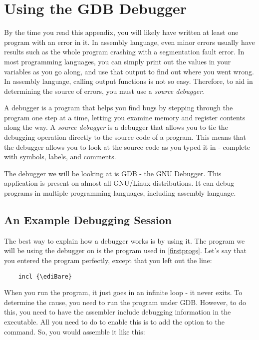 \chapter{Using the GDB Debugger}
\label{gdbappendix}

By the time you read this appendix, you will likely have written at least
one program with an error in it.  In assembly language, even minor errors
usually have results such as the whole program crashing with a segmentation
fault error.  In most programming languages, you can simply print out the
values in your variables as you go along, and use that output to find
out where you went wrong.  In assembly language, calling output functions
is not so easy.  Therefore, to aid in determining the source of errors,
you must use a \emph{source debugger}.

A debugger is a program that helps you find bugs by stepping through the 
program one step at a time, letting you examine memory and register 
contents along the way.  A \emph{source debugger} is
a debugger that allows you to tie the debugging operation directly 
to the source code of a program.  This means that the debugger 
allows you to look at the source code as you typed it in - complete with
symbols, labels, and comments.

The debugger we will be looking at is GDB - the GNU Debugger. This application
is present on almost all GNU/Linux distributions.  It can debug programs
in multiple programming languages, including assembly language.

\section{An Example Debugging Session}

The best way to explain how a debugger works is by using it.  The program
we will be using the debugger on is the 
program used in \autoref{firstprogs}.  Let's say that you entered
the program perfectly, except that you left out the line:

\begin{simpletyping}
\begin{lstlisting}
	incl {\ediBare}
\end{lstlisting}
\end{simpletyping}

When you run the program, it just goes in an infinite loop - it never exits.
To determine the cause, you need to run the program under GDB.  However,
to do this, you need to have the assembler include debugging information in the
executable.  All you need to do to enable this is to add the 
 option to the  command.
So, you would assemble it like this:

